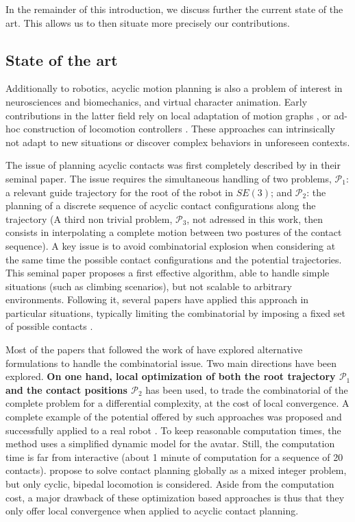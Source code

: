 In the remainder of this introduction, we discuss further the current state of the art. This allows us to then situate more precisely our contributions.

\subsection{State of the art}

\newcommand{\Pa}{$\mathcal{P}_1$ }
\newcommand{\Pb}{$\mathcal{P}_2$ }

Additionally to robotics, acyclic motion planning is also a problem of interest in neurosciences and biomechanics, and virtual character animation.
Early contributions in the latter field rely on local adaptation of motion graphs \citep{citeulike:220163}, or ad-hoc construction of locomotion controllers \citep{Pettre:2003:LPD:846276.846313}. These approaches can intrinsically not adapt to new situations or discover complex behaviors in unforeseen contexts.

The issue of planning acyclic contacts was first completely described by \citeauthor{conf/iser/BretlRLKA04} in their seminal paper. The issue requires the simultaneous handling of two problems, $\mathcal{P}_1$: a relevant guide trajectory for the root of the robot in $SE(3)$; and $\mathcal{P}_2$: the planning of a discrete sequence of acyclic contact configurations along the trajectory (A third non trivial problem, $\mathcal{P}_3$, not adressed in this work, then consists in interpolating a complete motion between two postures of the contact sequence).  A key issue is to avoid combinatorial explosion when considering at the same time the possible contact configurations and the potential trajectories. This seminal paper proposes a first effective algorithm, able to handle simple situations (such as climbing scenarios), but not scalable to arbitrary environments. Following it, seve\-ral papers have applied this approach in particular situations, typically limiting the combinatorial by imposing a fixed set of possible contacts \citep{Hauser06usingmotion, stilman2010}.

Most of the papers that followed the work of \citeauthor{conf/iser/BretlRLKA04} have explored alternative formulations to handle the combinatorial issue. Two main directions have been explored. \textbf{On one hand, local optimization of both the root trajectory \Pa and the contact positions $\mathcal{P}_2$} has been used, to trade the combinatorial of the complete problem for a differential complexity, at the cost of local convergence. A complete example of the potential offered by such approaches was proposed \citep{Mordatch:2012:DCB:2185520.2185539} and successfully applied to a real robot \citep{mordatch2015}. To keep reasonable computation times, the method uses a simplified dynamic model for the avatar. Still, the computation time is far from interactive  (about 1 minute of computation for a sequence of 20 contacts). \citeauthor{DBLP:conf/humanoids/DeitsT14} propose to solve contact planning globally as a mixed integer problem, but only cyclic, bipedal locomotion is considered. Aside from the computation cost, a major drawback of these optimization based approaches is thus that they only offer local convergence when applied to acyclic contact planning.

